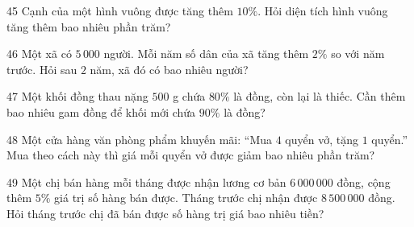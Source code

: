\gap
\begin{probbox}{45}{}
Cạnh của một hình vuông được tăng thêm $10\%$. Hỏi diện tích hình vuông tăng thêm bao nhiêu phần trăm?
\end{probbox}
\gap
\begin{probbox}{46}{}
Một xã có $5\,000$ người. Mỗi năm số dân của xã tăng thêm $2\%$ so với năm trước. Hỏi sau $2$ năm, xã đó có bao nhiêu người?
\end{probbox}
\gap
\begin{probbox}{47}{}
Một khối đồng thau nặng $500$ g chứa $80\%$ là đồng, còn lại là thiếc. Cần thêm bao nhiêu gam đồng để khối mới chứa $90\%$ là đồng?
\end{probbox}
\gap
\begin{probbox}{48}{}
Một cửa hàng văn phòng phẩm khuyến mãi: ``Mua $4$ quyển vở, tặng $1$ quyển.'' Mua theo cách này thì giá mỗi quyển vở được giảm bao nhiêu phần trăm?
\end{probbox}
\gap
\begin{probbox}{49}{}
Một chị bán hàng mỗi tháng được nhận lương cơ bản $6\,000\,000$ đồng, cộng thêm $5\%$ giá trị số hàng bán được. Tháng trước chị nhận được $8\,500\,000$ đồng. Hỏi tháng trước chị đã bán được số hàng trị giá bao nhiêu tiền?
\end{probbox}
